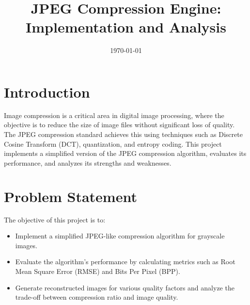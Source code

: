 \documentclass[12pt,a4paper]{article}
\title{JPEG Compression Engine: Implementation and Analysis}
\author{}
\date{\today}
\begin{document}
\maketitle

\tableofcontents

\section{Introduction}
Image compression is a critical area in digital image processing, where the objective is to reduce the size of image files without significant loss of quality. The JPEG compression standard achieves this using techniques such as Discrete Cosine Transform (DCT), quantization, and entropy coding. This project implements a simplified version of the JPEG compression algorithm, evaluates its performance, and analyzes its strengths and weaknesses.

\section{Problem Statement}
The objective of this project is to:
\begin{itemize}
    \item Implement a simplified JPEG-like compression algorithm for grayscale images.
    \item Evaluate the algorithm's performance by calculating metrics such as Root Mean Square Error (RMSE) and Bits Per Pixel (BPP).
    \item Generate reconstructed images for various quality factors and analyze the trade-off between compression ratio and image quality.
\end{itemize}
\end{document}
